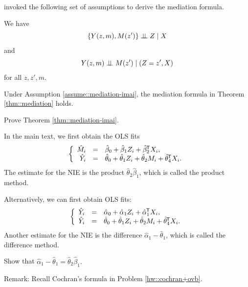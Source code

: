 \begin{HomeworkProblem}\label{exr:27-4}



\citet{Imai::2010} invoked the following set of assumptions to derive the mediation formula.

\begin{assumption}
\label{assume::mediation-imai}
We have
\[
\{Y(z, m), M(z') \} \mathrel{\perp\!\!\!\perp}  Z\mid X
\]
and
\[
Y(z, m) \mathrel{\perp\!\!\!\perp} M(z' ) \mid (Z=z' , X)
\]
for all $z, z', m$.
\end{assumption}


\begin{Theorem}
\label{thm::mediation-imai}
Under Assumption \ref{assume::mediation-imai}, the mediation formula in Theorem \ref{thm::mediation} holds.
\end{Theorem}


Prove Theorem \ref{thm::mediation-imai}.



\end{HomeworkProblem}

\begin{HomeworkProblem}\label{exr:27-5}


In the main text, we first obtain the OLS fits
\[
\left\{\begin{array}{rcl}
\hat M_i &=&  \hat\beta_0 + \hat\beta_1 Z_i + \hat\beta_2^{\mkern-1.5mu\mathsf{T}} X_i, \\
\hat Y_i &=&\hat \theta_0 + \hat\theta_1 Z_i +\hat \theta_2 M_i + \hat\theta_4^{\mkern-1.5mu\mathsf{T}} X_i.
\end{array}\right.
\]
The estimate for the NIE is the product $\hat \theta_2 \hat\beta_1 $, which is called the product method.

Alternatively, we can first obtain OLS fits:
\[
\left\{\begin{array}{rcl}
\hat Y_i &=&  \hat\alpha_0 + \hat\alpha_1 Z_i + \hat\alpha_1 ^{\mkern-1.5mu\mathsf{T}} X_i, \\
\hat Y_i &=&\hat \theta_0 + \hat\theta_1 Z_i +\hat \theta_2 M_i + \hat\theta_4^{\mkern-1.5mu\mathsf{T}} X_i.
\end{array}\right.
\]
Another estimate for the NIE is the difference $\hat\alpha_1 -  \hat\theta_1$, which is called the difference method.

Show that $\hat\alpha_1 -  \hat\theta_1 = \hat \theta_2 \hat\beta_1 .$


Remark: Recall Cochran's formula in Problem \ref{hw::cochran+ovb}.



\end{HomeworkProblem}

